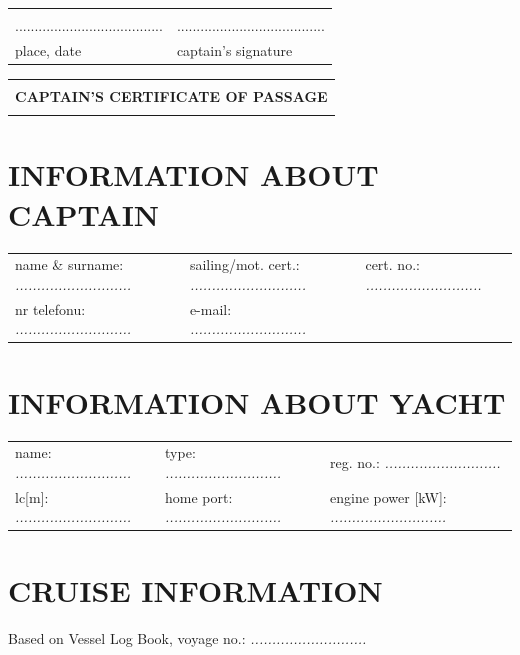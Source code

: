 \documentclass{article}
\begin{document}
\begin{tabularx}{\textwidth}{X X}
\\\\
...................................... & ......................................\\
place, date & captain's signature\\
\end{tabularx}
\newpage
\begin{tabularx}{\textwidth} { 
  | >{\centering\arraybackslash}X | }
 \hline
 \\
 \textbf{\huge CAPTAIN’S  CERTIFICATE  OF  PASSAGE} \\
 \\
\hline
\end{tabularx}

\section*{INFORMATION ABOUT CAPTAIN}
\begin{tabularx}{\textwidth}{X X X}
name \& surname: \textit{...........................} & sailing/mot. cert.: \textit{...........................} & cert. no.: \textit{...........................} \\
nr telefonu: \textit{...........................} & e-mail: \textit{...........................} \\
\end{tabularx}

\section*{INFORMATION ABOUT YACHT}

\begin{tabularx}{\textwidth}{X X X}
name: \textit{...........................} & type: \textit{...........................} & reg. no.: \textit{...........................} \\
lc[m]: \textit{...........................} & home port: \textit{...........................} & engine power [kW]: \textit{...........................} \\
\end{tabularx}

\section*{CRUISE INFORMATION}

Based on Vessel Log Book, voyage no.: \textit{...........................}
\\
\end{document}
